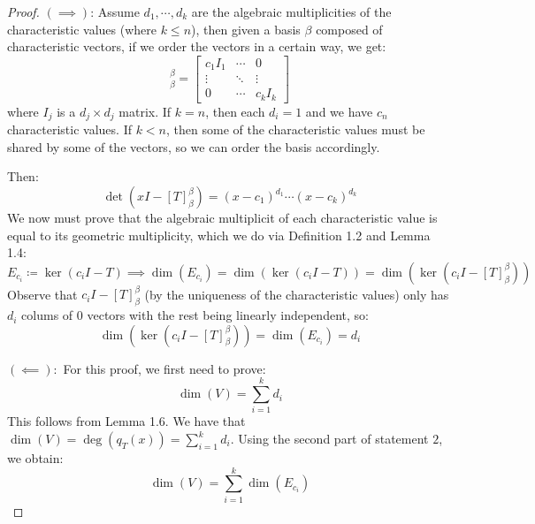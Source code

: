 \documentclass[10pt,letterpaper]{article} %
\begin{document}
\begin{proof}
$(\implies)$: Assume $d_1, \cdots, d_k$ are the algebraic multiplicities of the characteristic values (where $k \leqslant n$), then given a basis $\beta$ composed of characteristic vectors, if we order the vectors in a certain way, we get:
\begin{equation*}
[T]_\beta^\beta = \begin{bmatrix}
c_1I_1 & \cdots & 0\\
\vdots & \ddots & \vdots\\
0 & \cdots & c_kI_k
\end{bmatrix}
\end{equation*}
where $I_j$ is a $d_j \times d_j$ matrix. If $k = n$, then each $d_i = 1$ and we have $c_n$ characteristic values. If $k < n$, then some of the characteristic values must be shared by some of the vectors, so we can order the basis accordingly.

Then:
\begin{equation*}
\det(xI - [T]_\beta^\beta) = (x - c_1)^{d_1} \cdots (x - c_k)^{d_k}
\end{equation*}
We now must prove that the algebraic multiplicit of each characteristic value is equal to its geometric multiplicity, which we do via Definition 1.2 and Lemma 1.4:
\begin{equation*}
E_{c_i} \coloneq \ker(c_iI - T) \implies \dim(E_{c_i}) = \dim(\ker(c_iI - T)) = \dim(\ker(c_iI - [T]_{\beta}^{\beta}))
\end{equation*}
Observe that $c_iI - [T]_{\beta}^{\beta}$ (by the uniqueness of the characteristic values) only has $d_i$ colums of $0$ vectors with the rest being linearly independent, so:
\begin{equation*}
\dim(\ker(c_iI - [T]_{\beta}^\beta)) = \dim(E_{c_i}) = d_i
\end{equation*}

$(\impliedby):$ For this proof, we first need to prove:
\begin{equation*}
\dim(V) = \sum_{i=1}^{k}d_i
\end{equation*}
This follows from Lemma 1.6. We have that $\dim(V) = \deg(q_T(x)) = \sum_{i=1}^{k}d_i$. Using the second part of statement $2$, we obtain:
\begin{equation*}
\dim(V) = \sum_{i=1}^{k}\dim(E_{c_i})
\end{equation*}


\end{proof}
\end{document}
